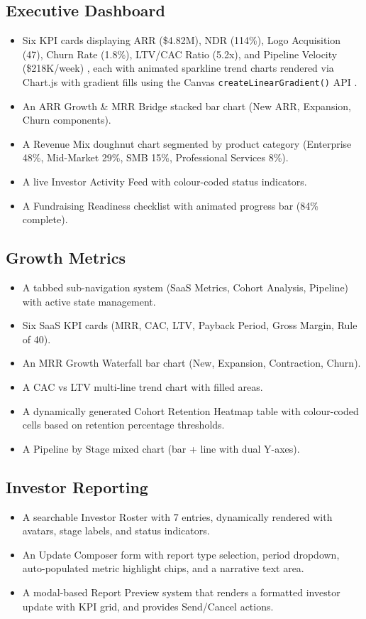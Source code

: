 \documentclass{book}
\begin{document}
\subsection{Executive Dashboard}
\begin{itemize}
    \item Six KPI cards displaying ARR (\$4.82M), NDR (114\%), Logo Acquisition (47), Churn Rate (1.8\%), LTV/CAC Ratio (5.2x), and Pipeline Velocity (\$218K/week) \cite{tunguz2016saas}, each with animated sparkline trend charts rendered via Chart.js with gradient fills using the Canvas \texttt{createLinearGradient()} API \cite{w3ccanvas2024}.
    \item An ARR Growth \& MRR Bridge stacked bar chart (New ARR, Expansion, Churn components).
    \item A Revenue Mix doughnut chart segmented by product category (Enterprise 48\%, Mid-Market 29\%, SMB 15\%, Professional Services 8\%).
    \item A live Investor Activity Feed with colour-coded status indicators.
    \item A Fundraising Readiness checklist with animated progress bar (84\% complete).
\end{itemize}

\subsection{Growth Metrics}
\begin{itemize}
    \item A tabbed sub-navigation system (SaaS Metrics, Cohort Analysis, Pipeline) with active state management.
    \item Six SaaS KPI cards (MRR, CAC, LTV, Payback Period, Gross Margin, Rule of 40).
    \item An MRR Growth Waterfall bar chart (New, Expansion, Contraction, Churn).
    \item A CAC vs LTV multi-line trend chart with filled areas.
    \item A dynamically generated Cohort Retention Heatmap table with colour-coded cells based on retention percentage thresholds.
    \item A Pipeline by Stage mixed chart (bar + line with dual Y-axes).
\end{itemize}

\subsection{Investor Reporting}
\begin{itemize}
    \item A searchable Investor Roster with 7 entries, dynamically rendered with avatars, stage labels, and status indicators.
    \item An Update Composer form with report type selection, period dropdown, auto-populated metric highlight chips, and a narrative text area.
    \item A modal-based Report Preview system that renders a formatted investor update with KPI grid, and provides Send/Cancel actions.
\end{itemize}
\end{document}
